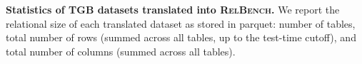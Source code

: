 \documentclass{article} %
\newcommand{\relbench}{\textsc{RelBench}\xspace}
\begin{document}
\begin{table}[t]                                                                                                                                                                                                                                         
    \centering                                                                                                                                                                                                                                               
    \caption{{\bf Statistics of TGB datasets translated into \relbench.}                                                                                                                                                                                     
    We report the relational size of each translated dataset as stored in parquet:                                                                                                                                                                           
    number of tables, total number of rows (summed across all tables, up to the test-time cutoff), and total number of columns (summed across all tables).                                                                                                   
    }                                                                                                                                                                                                                                                        
    \label{tab:stats_tgb_datasets}                                                                                                                                                                                                                           
    \begingroup                                                                                                                                                                                                                                              
    \scriptsize  
    \vspace{-5pt}
    \setlength{\tabcolsep}{3pt}                                                                                                                                                                                                                              

\end{table}
\end{document}
